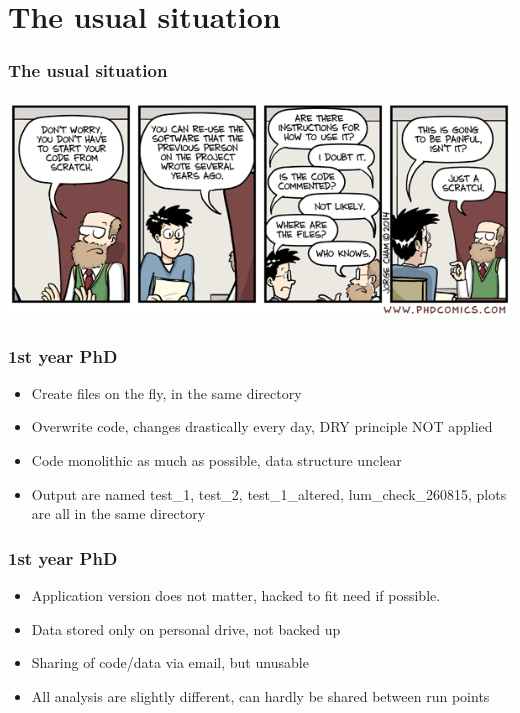 \documentclass[14pt]{beamer}
\begin{document}
\section{The usual situation}
\begin{frame}
\frametitle{The usual situation}
\includegraphics[width=\textwidth]{painful_but_true}
\end{frame}
\begin{frame}
\frametitle{1st year PhD}
\begin{itemize}
\item Create files on the fly, in the same directory
\item Overwrite code, changes drastically every day, DRY principle NOT applied
\item Code monolithic as much as possible, data structure unclear
\item Output are named test\_1, test\_2, test\_1\_altered, lum\_check\_260815, plots are all in the same directory
\end{itemize}
\end{frame}

\begin{frame}
\frametitle{1st year PhD}
\begin{itemize}
\item Application version does not matter, hacked to fit need if possible.
\item Data stored only on personal drive, not backed up
\item Sharing of code/data via email, but unusable
\item All analysis are slightly different, can hardly be shared between run points
\end{itemize}
\end{frame}
\end{document}

